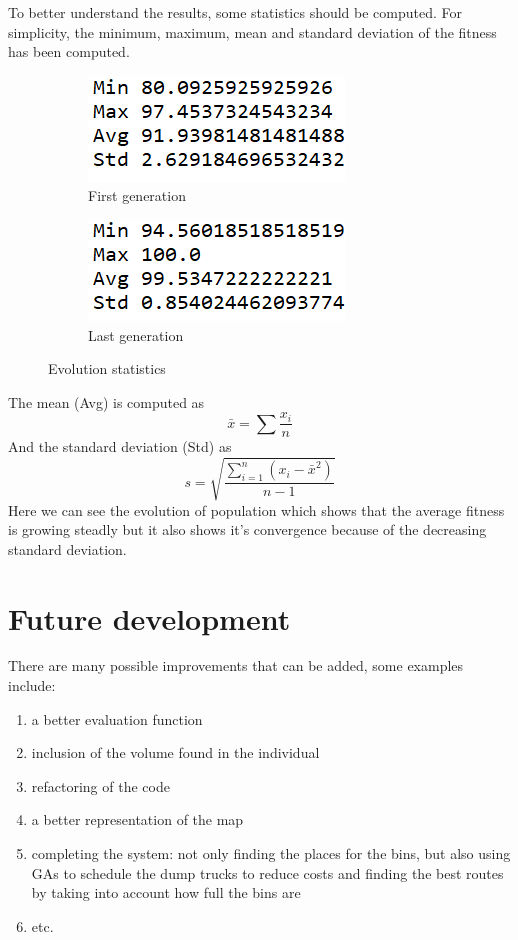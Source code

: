 \documentclass[a4paper,12pt]{report}
\begin{document}
To better understand the results, some statistics should be computed. For simplicity, the minimum, maximum, mean and standard deviation of the fitness has been computed.

\begin{figure}[H]
 \centering
\begin{subfigure}{0.3\textwidth}
\includegraphics[width=0.9\linewidth]{fig/stats1} 
\caption{First generation}
\label{fig:stats1}
\end{subfigure}
\begin{subfigure}{0.3\textwidth}
\includegraphics[width=0.9\linewidth]{fig/stats2}
\caption{Last generation}
\label{fig:stats2}
\end{subfigure}
 
\caption{Evolution statistics}
\label{fig:ev}
\end{figure}

The mean (Avg) is computed as 
 \[ \bar{x} = \sum {\frac{x_i}{n}} \]
And the standard deviation (Std) as
\[ s = \sqrt{\frac{\sum_{i=1}^n(x_i - \bar{x}^2)}{n-1}}  \]
Here we can see the evolution of population which shows that the average fitness is growing steadly but it also shows it's convergence because of the decreasing standard deviation.

\section {Future development}
There are many possible improvements that can be added, some examples include: 
\begin{enumerate}
\item a better evaluation function
\item inclusion of the volume found in the individual
\item refactoring of the code
\item a better representation of the map
\item completing the system: not only finding the places for the bins, but also using GAs to schedule the dump trucks to reduce costs and finding the best routes by taking into account how full the bins are
\item etc.
\end{enumerate}
\end{document}
